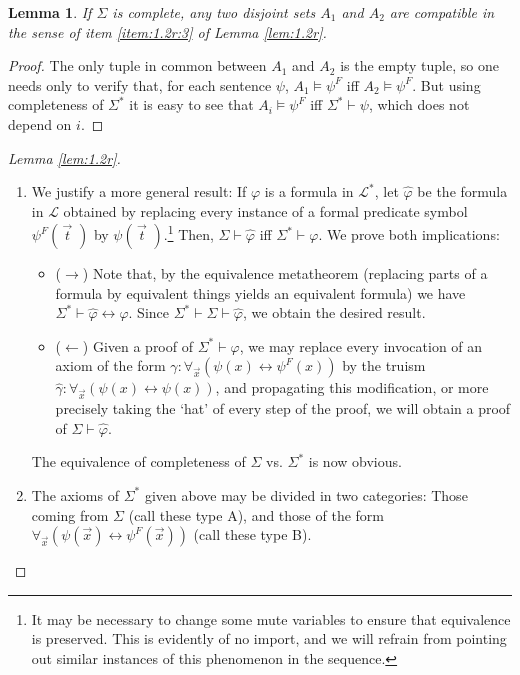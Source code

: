 \documentclass{article}
\newtheorem{lemma}[theorem]{Lemma}
\theoremstyle{nonumberplain}
\newtheorem{proof}{Proof}
\newcommand{\Lang}{\mathcal{L}}
\begin{document}
\begin{lemma}\label{lem:compatible}
If $\Sigma$ is complete, any two disjoint sets $A_1$ and $A_2$ are compatible in the sense of item \ref{item:1.2r:3} of Lemma \ref{lem:1.2r}.
\end{lemma}

\begin{proof}
The only tuple in common between $A_1$ and $A_2$ is the empty tuple, so one needs only to verify that, for each sentence $\psi$, $A_1 \vDash \psi^F$ iff $A_2 \vDash \psi^F$. But using completeness of $\Sigma^*$ it is easy to see that $A_i \vDash \psi^F$ iff $\Sigma^* \vdash \psi$, which does not depend on $i$.
\end{proof}

\begin{proof}[Lemma \ref{lem:1.2r}]
\leavevmode
\begin{enumerate}
\item We justify a more general result: If $\varphi$ is a formula in $\Lang^*$, let $\hat\varphi$ be the formula in $\Lang$ obtained by replacing every instance of a formal predicate symbol $\psi^F(\,\vec{t\!}\,\,)$ by $\psi(\,\vec{t\!}\,\,)$.\footnote{It may be necessary to change some mute variables to ensure that equivalence is preserved. This is evidently of no import, and we will refrain from pointing out similar instances of this phenomenon in the sequence.} Then, $\Sigma \vdash \hat\varphi$ iff $\Sigma^* \vdash \varphi$. We prove both implications:
\begin{itemize}
\item ($\rightarrow$) Note that, by the equivalence metatheorem (replacing parts of a formula by equivalent things yields an equivalent formula) we have $\Sigma^* \vdash \hat\varphi \leftrightarrow \varphi$. Since $\Sigma^* \vdash \Sigma \vdash \hat\varphi$, we obtain the desired result.
\item ($\leftarrow$) Given a proof of $\Sigma^* \vdash \varphi$, we may replace every invocation of an axiom of the form $\gamma \colon \forall_{\vec x} (\psi(x) \leftrightarrow \psi^F(x))$ by the truism $\hat\gamma \colon \forall_{\vec x} (\psi(x) \leftrightarrow \psi(x))$, and propagating this modification, or more precisely taking the `hat' of every step of the proof, we will obtain a proof of $\Sigma \vdash \hat\varphi$.
\end{itemize}

The equivalence of completeness of $\Sigma$ vs. $\Sigma^*$ is now obvious.

\item The axioms of $\Sigma^*$ given above may be divided in two categories: Those coming from $\Sigma$ (call these type A), and those of the form $\forall_{\vec x} (\psi(\vec x) \leftrightarrow \psi^F(\vec x))$ (call these type B).


\end{enumerate}
\end{proof}
\end{document}
